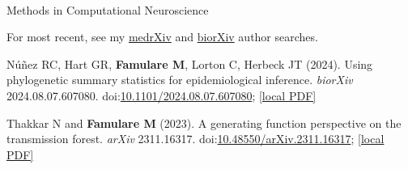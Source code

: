 \documentclass{article}
\begin{document}
\begin{llist}
  

  \\
Methods in Computational Neuroscience 









  \vspace{4pt}

\begin{items}
	
\item[{}] For most recent, see my \href{https://www.medrxiv.org/search/author1%3AM%2BFamulare%20jcode%3Amedrxiv%20numresults%3A75%20sort%3Apublication-date%20direction%3Adescending%20format_result%3Astandard}{medrXiv} and \href{https://www.biorxiv.org/search/author1%3AM%2BFamulare%20jcode%3Abiorxiv%20numresults%3A75%20sort%3Apublication-date%20direction%3Adescending%20format_result%3Astandard}{biorXiv} author searches. 

\item[{[7]}] N\'{u}\~{n}ez RC, Hart GR, \textbf{Famulare M}, Lorton C, Herbeck JT (2024). Using phylogenetic summary statistics for epidemiological inference. \emph{biorXiv} 2024.08.07.607080. doi:\href{https://doi.org/10.1101/2024.08.07.607080}{10.1101/2024.08.07.607080}; \href{https://famulare.github.io/assets/publication-mirror/preprint-07.pdf}{[local PDF]}

\item[{[6]}] Thakkar N and \textbf{Famulare M} (2023). A generating function perspective on the transmission forest. \emph{arXiv} 2311.16317. doi:\href{https://doi.org/10.48550/arXiv.2311.16317}{10.48550/arXiv.2311.16317}; \href{https://famulare.github.io/assets/publication-mirror/preprint-06.pdf}{[local PDF]}


\end{items}
\end{llist}
\end{document}
